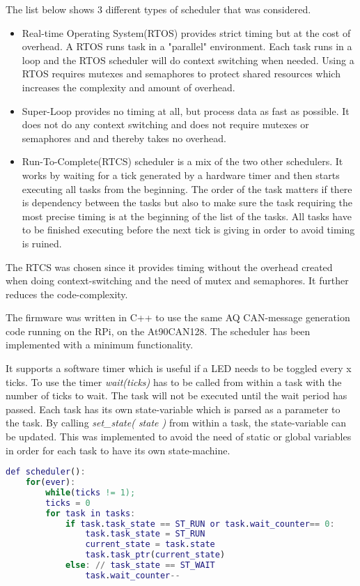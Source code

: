 The list below shows 3 different types of scheduler that was considered.
\begin{itemize}
	\item Real-time Operating System(RTOS) provides strict timing but at the cost of overhead. A RTOS runs task in a "parallel" environment. Each task runs in a loop and the RTOS scheduler will do context switching when needed. Using a RTOS requires mutexes and semaphores to protect shared resources which increases the complexity and amount of overhead.
	\item Super-Loop provides no timing at all, but process data as fast as possible. It does not do any context switching and does not require mutexes or semaphores and  and thereby takes no overhead.
	\item Run-To-Complete(RTCS) scheduler is a mix of the two other schedulers. It works by waiting for a tick generated by a hardware timer and then starts executing all tasks from the beginning. The order of the task matters if there is dependency between the tasks but also to make sure the task requiring the most precise timing is at the beginning of the list of the tasks. All tasks have to be finished executing before the next tick is giving in order to avoid timing is ruined.
\end{itemize}
The RTCS was chosen since it provides timing without the overhead created when doing context-switching and the need of mutex and semaphores. It further reduces the code-complexity.

The firmware was written in C++ to use the same \ac{AQ} CAN-message generation code running on the \ac{RPi}, on the At90CAN128.
The scheduler has been implemented with a minimum functionality.

It supports a software timer which is useful if a \ac{LED} needs to be toggled every x ticks. To use the timer  \textit{wait(ticks)} has to be called from within a task with the number of ticks to wait.
The task will not be executed until the wait period has passed. Each task has its own state-variable which is parsed as a parameter to the task. By calling \textit{set\_state( state )} from within a task, the state-variable can be updated. This was implemented to avoid the need of static or global variables in order for each task to have its own state-machine.

\begin{lstlisting}[language = Matlab, caption = Pseudo code of the RTCS scheduler implemented, label=code:rtcs_implemented]
def scheduler():
	for(ever):
		while(ticks != 1);
		ticks = 0
		for task in tasks:
			if task.task_state == ST_RUN or task.wait_counter== 0:
				task.task_state = ST_RUN
				current_state = task.state
				task.task_ptr(current_state)
			else: // task_state == ST_WAIT
				task.wait_counter--
\end{lstlisting}

